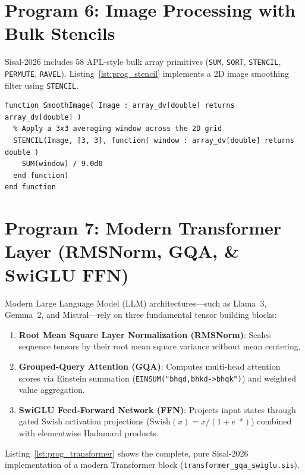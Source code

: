 \section{Program 6: Image Processing with Bulk Stencils}
Sisal-2026 includes 58 APL-style bulk array primitives (\texttt{SUM}, \texttt{SORT}, \texttt{STENCIL}, \texttt{PERMUTE}, \texttt{RAVEL}). Listing~\ref{lst:prog_stencil} implements a 2D image smoothing filter using \texttt{STENCIL}.

\begin{lstlisting}[caption={2D Image Smoothing Stencil (\texttt{image\_smooth.sis})},label={lst:prog_stencil}]
function SmoothImage( Image : array_dv[double] returns array_dv[double] )
  % Apply a 3x3 averaging window across the 2D grid
  STENCIL(Image, [3, 3], function( window : array_dv[double] returns double )
    SUM(window) / 9.0d0
  end function)
end function
\end{lstlisting}

\section{Program 7: Modern Transformer Layer (RMSNorm, GQA, \& SwiGLU FFN)}
Modern Large Language Model (LLM) architectures---such as Llama~3, Gemma~2, and Mistral---rely on three fundamental tensor building blocks:
\begin{enumerate}
    \item \textbf{Root Mean Square Layer Normalization (RMSNorm)}: Scales sequence tensors by their root mean square variance without mean centering.
    \item \textbf{Grouped-Query Attention (GQA)}: Computes multi-head attention scores via Einstein summation (\texttt{EINSUM("bhqd,bhkd->bhqk")}) and weighted value aggregation.
    \item \textbf{SwiGLU Feed-Forward Network (FFN)}: Projects input states through gated Swish activation projections ($\text{Swish}(x) = x / (1 + e^{-x})$) combined with elementwise Hadamard products.
\end{enumerate}

Listing~\ref{lst:prog_transformer} shows the complete, pure Sisal-2026 implementation of a modern Transformer block (\texttt{transformer\_gqa\_swiglu.sis}).

